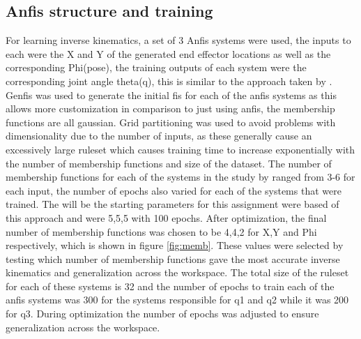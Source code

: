 \documentclass[a4paper,11pt]{article}
\begin{document}
\subsection{Anfis structure and training}
For learning inverse kinematics, a set of 3 Anfis systems were used, the inputs to each were the X and Y of the generated end effector locations as well as the corresponding Phi(pose), the training outputs of each system were the corresponding joint angle theta(q), this is similar to the approach taken by \cite{anfis1}. Genfis was used to generate the initial fis for each of the anfis systems as this allows more customization in comparison to just using anfis, the membership functions are all gaussian. 
Grid partitioning was used to avoid problems with dimensionality due to the number of inputs, as these generally cause an excessively large ruleset which causes training time to increase exponentially with the number of membership functions and size of the dataset.
\newline
\newline
The number of membership functions for each of the systems in the study by \cite{anfis2} ranged from 3-6 for each input, the number of epochs also varied for each of the systems that were trained. The will be the starting parameters for this assignment were based of this approach and were 5,5,5 with 100 epochs. After optimization, the final number of membership functions was chosen to be 4,4,2 for X,Y and Phi respectively, which is shown in figure \ref{fig:memb}. 
These values were selected by testing which number of membership functions gave the most accurate inverse kinematics and generalization across the workspace. The total size of the ruleset for each of these systems is 32 and the number of epochs to train each of the anfis systems was 300 for the systems responsible for q1 and q2 while it was 200 for q3. During optimization the number of epochs was adjusted to ensure generalization across the workspace.
\end{document}
